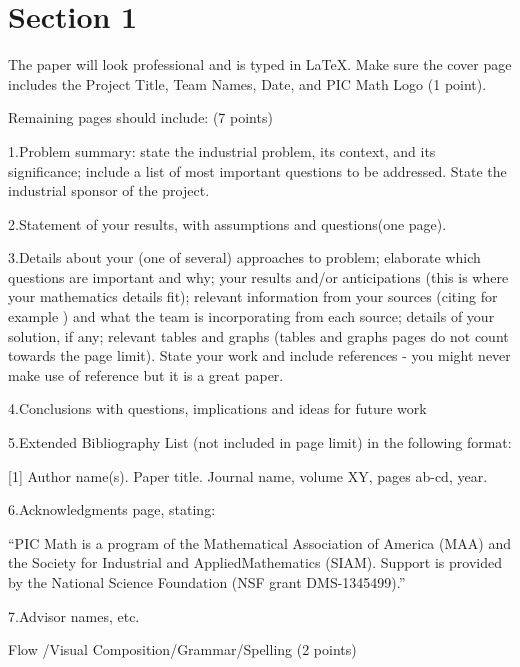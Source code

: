 \documentclass[12pt]{report}
\begin{document}

\tableofcontents
\pagebreak

\renewcommand{\thesection}{\arabic{section}}
\section{Section 1}
 

The paper will look professional and is typed in LaTeX. Make sure the cover page       includes the Project Title, Team Names, Date, and PIC Math Logo (1 point).

Remaining pages should include: (7 points) 

1.Problem summary: state the industrial problem, its context, and its significance; include a list of most important questions to be addressed. State the industrial sponsor of the project. 

2.Statement of your results, with assumptions and questions(one page).

3.Details about your (one of several) approaches to problem; elaborate which questions are important and why; your results and/or anticipations (this is where your mathematics details fit); relevant information from your sources (citing for example \cite{ACAMP}) and what the team is incorporating from each source; details of your solution, if any; relevant tables and graphs (tables and graphs pages do not count towards the page limit). State your work and include references - you might never make use of reference \cite{ACMT} but it is a great paper.

4.Conclusions with questions, implications and ideas for future work

5.Extended Bibliography List (not included in page limit) in the following format: 

[1] Author name(s). Paper title. Journal name, volume XY, pages ab-cd, year. 

6.Acknowledgments page, stating:

“PIC Math is a program of the Mathematical Association of America (MAA) and the Society for Industrial and AppliedMathematics (SIAM). Support is provided by the National Science Foundation (NSF grant DMS-1345499).”

7.Advisor names, etc. 

Flow /Visual Composition/Grammar/Spelling (2 points) 
\end{document}
